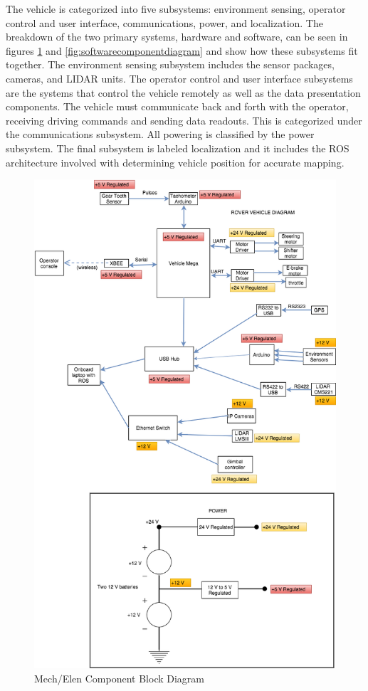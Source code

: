 The vehicle is categorized into five subsystems: environment sensing, operator control and user interface, communications, power, and localization. The breakdown of the two primary systems, hardware and software, can be seen in figures \ref{fig:mechelencomponentdiagram} and \ref{fig:softwarecomponentdiagram} and show how these subsystems fit together. The environment sensing subsystem includes the sensor packages, cameras, and LIDAR units. The operator control and user interface subsystems are the systems that control the vehicle remotely as well as the data presentation components. The vehicle must communicate back and forth with the operator, receiving driving commands and sending data readouts. This is categorized under the communications subsystem. All powering is classified by the power subsystem. The final subsystem is labeled localization and it includes the ROS architecture involved with determining vehicle position for accurate mapping.
\begin{figure}[H]
	\centering
	\includegraphics[scale=0.5]{Mech-elen_Component_Block_Diagram}
	\caption{Mech/Elen Component Block Diagram}
	\label{fig:mechelencomponentdiagram}
\end{figure}
%

